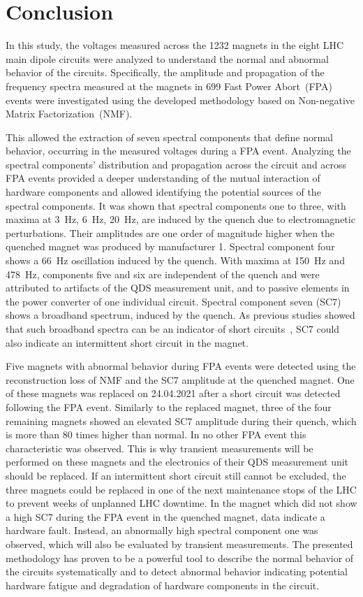 \documentclass[lettersize,journal]{IEEEtran}
\begin{document}
\section{Conclusion}\label{Conclusion}
In this study, the voltages measured across the 1232 magnets in the eight LHC main dipole circuits were analyzed to understand the normal and abnormal behavior of the circuits.
Specifically, the amplitude and propagation of the frequency spectra measured at the magnets in 699 Fast Power Abort~(FPA) events were investigated using the developed methodology based on Non-negative Matrix Factorization~(NMF).

This allowed the extraction of seven spectral components that define normal behavior, occurring in the measured voltages during a FPA event. 
Analyzing the spectral components' distribution and propagation across the circuit and across FPA events provided a deeper understanding of the mutual interaction of hardware components and allowed identifying the potential sources of the spectral components. 
It was shown that spectral components one to three, with maxima at 3~Hz, 6~Hz, 20~Hz, are induced by the quench due to electromagnetic perturbations. Their amplitudes are one order of magnitude higher when the quenched magnet was produced by manufacturer 1.
Spectral component four shows a 66~Hz oscillation induced by the quench.
With maxima at 150~Hz and 478~Hz, components five and six are independent of the quench and were attributed to artifacts of the QDS measurement unit, and to passive elements in the power converter of one individual circuit.
Spectral component seven (SC7) shows a broadband spectrum, induced by the quench.
As previous studies showed that such broadband spectra can be an indicator of short circuits~\cite{charifoulline2016overview}, SC7 could also indicate an intermittent short circuit in the magnet.

Five magnets with abnormal behavior during FPA events were detected using the reconstruction loss of NMF and the SC7 amplitude at the quenched magnet.
One of these magnets was replaced on 24.04.2021 after a short circuit was detected following the FPA event. 
Similarly to the replaced magnet, three of the four remaining magnets showed an elevated SC7 amplitude during their quench, which is more than 80 times higher than normal.
In no other FPA event this characteristic was observed. This is why transient measurements will be performed on these magnets and the electronics of their QDS measurement unit should be replaced. 
If an intermittent short circuit still cannot be excluded, the three magnets could be replaced in one of the next maintenance stops of the LHC to prevent weeks of unplanned LHC downtime. 
In the magnet which did not show a high SC7 during the FPA event in the quenched magnet, data indicate a hardware fault.
Instead, an abnormally high spectral component one was observed, which will also be evaluated by transient measurements.
The presented methodology has proven to be a powerful tool to describe the normal behavior of the circuits systematically and to detect abnormal behavior indicating potential hardware fatigue and degradation of hardware components in the circuit.
\end{document}

